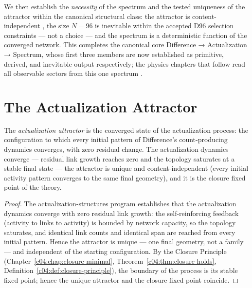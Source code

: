 We then establish the \emph{necessity} of the spectrum and the tested uniqueness of the
attractor within the canonical structural class: the attractor is content-independent
\cite{c05:QG116}, the size $N=96$ is inevitable within the accepted D96 selection
constraints --- not a choice \cite{c05:QG159,c05:QG160} --- and the spectrum is a
deterministic function of the converged network. This completes the canonical core
Difference → Actualization → Spectrum, whose first three members are now established as
primitive, derived, and inevitable output respectively; the physics chapters that follow
read all observable sectors from this one spectrum \cite{c05:QG293,c05:QG294,c05:QG296}.

\section{The Actualization Attractor}
\label{c05:sec:attractor}

\begin{theorem}
\label{c05:thm:attractor-unique}
The \emph{actualization attractor} is the converged state of the actualization process: the
configuration to which every initial pattern of Difference's count-producing dynamics
converges, with zero residual change. The actualization dynamics converge --- residual link
growth reaches zero and the topology saturates at a stable final state --- the attractor is
unique and content-independent (every initial activity pattern converges to the same final
geometry), and it is the closure fixed point of the theory.
\end{theorem}

\begin{proof}
The actualization-structures program \cite{c05:QG116} establishes that the actualization
dynamics converge with zero residual link growth: the self-reinforcing feedback (activity to
links to activity) is bounded by network capacity, so the topology saturates, and identical
link counts and identical span are reached from every initial pattern. Hence the attractor
is unique --- one final geometry, not a family --- and independent of the starting
configuration. By the Closure Principle (Chapter~\ref{c04:chap:closure-minimal},
Theorem~\ref{c04:thm:closure-holds}, Definition~\ref{c04:def:closure-principle}), the boundary
of the process is its stable fixed point; hence the unique attractor and the closure fixed
point coincide.
\end{proof}

